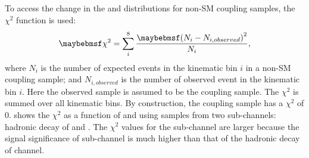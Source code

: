 To access the change in the \mhh and \HT distributions for  non-SM coupling samples, the $\chi^2$ function is used:
\begin{equation}
\chi^2 = \sum_{i}^{8}\frac{\parenths{N_i - N_{i,observed}}^2}{N_{i}},
\label{eqn:doubleHiggsChi2}
\end{equation}
where $N_i$ is the number of expected  events in the kinematic bin $i$ in a non-SM coupling sample; and $ N_{i,observed}$ is the number of observed  event in the kinematic bin $i$. Here the observed sample is assumed to be the \SM coupling sample. The  $\chi^2$  is summed over all kinematic bins. By construction, the \SM coupling sample has a $\chi^2$ of 0.  shows the $\chi^2$  as a function of \gHHH and \gWWHH using samples from two sub-channels: hadronic \WW decay of \eeToHHbbWW and \eeToHHbbbb. The $\chi^2$ values for the \eeToHHbbbb sub-channel are larger because the signal significance of \eeToHHbbbb  sub-channel is much higher than that of the hadronic \WW decay of \eeToHHbbWW channel.



